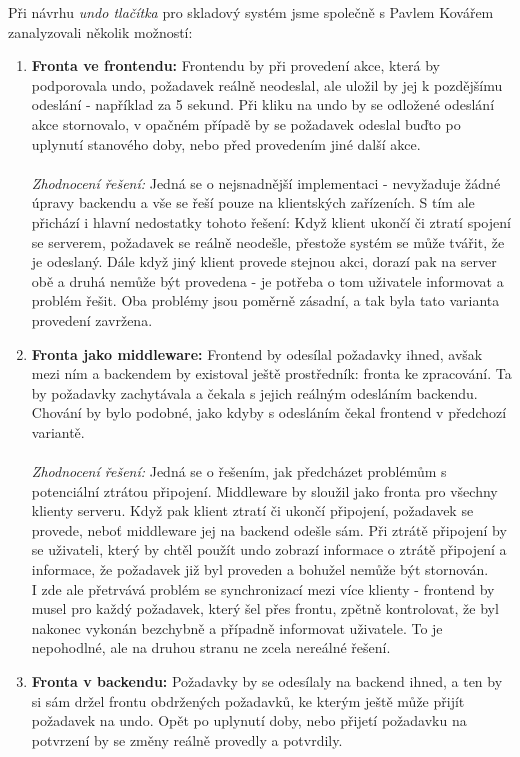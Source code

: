 Při návrhu \emph{undo tlačítka} pro skladový systém jsme společně s Pavlem Kovářem zanalyzovali několik možností:
\begin{enumerate}
	\item \textbf{Fronta ve frontendu:} Frontendu by při provedení akce, která by podporovala undo, požadavek reálně neodeslal, ale uložil by jej k pozdějšímu odeslání - například za 5 sekund. Při kliku na undo by se odložené odeslání akce stornovalo, v opačném případě by se požadavek odeslal buďto po uplynutí stanového doby, nebo před provedením jiné další akce.\\\\
	\emph{Zhodnocení řešení:} Jedná se o nejsnadnější implementaci - nevyžaduje žádné úpravy backendu a vše se řeší pouze na klientských zařízeních. S tím ale přichází i hlavní nedostatky tohoto řešení: Když klient ukončí či ztratí spojení se serverem, požadavek se reálně neodešle, přestože systém se může tvářit, že je odeslaný. Dále když jiný klient provede stejnou akci, dorazí pak na server obě a druhá nemůže být provedena - je potřeba o tom uživatele informovat a problém řešit. Oba problémy jsou poměrně zásadní, a tak byla tato varianta provedení zavržena.
	\item \textbf{Fronta jako middleware:} Frontend by odesílal požadavky ihned, avšak mezi ním a backendem by existoval ještě prostředník: fronta ke zpracování. Ta by požadavky zachytávala a čekala s jejich reálným odesláním backendu. Chování by bylo podobné, jako kdyby s odesláním čekal frontend v předchozí variantě.\\\\
	\emph{Zhodnocení řešení:} Jedná se o řešením, jak předcházet problémům s potenciální ztrátou připojení. Middleware by sloužil jako fronta pro všechny klienty serveru. Když pak klient ztratí či ukončí připojení, požadavek se provede, neboť middleware jej na backend odešle sám. Při ztrátě připojení by se uživateli, který by chtěl použít undo zobrazí informace o ztrátě připojení a informace, že požadavek již byl proveden a bohužel nemůže být stornován.\\
	I zde ale přetrvává problém se synchronizací mezi více klienty - frontend by musel pro každý požadavek, který šel přes frontu, zpětně kontrolovat, že byl nakonec vykonán bezchybně a případně informovat uživatele. To je nepohodlné, ale na druhou stranu ne zcela nereálné řešení.
	\item \textbf{Fronta v backendu:} Požadavky by se odesílaly na backend ihned, a ten by si sám držel frontu obdržených požadavků, ke kterým ještě může přijít požadavek na undo. Opět po uplynutí doby, nebo přijetí požadavku na potvrzení by se změny reálně provedly a potvrdily.\\\\

\end{enumerate}
